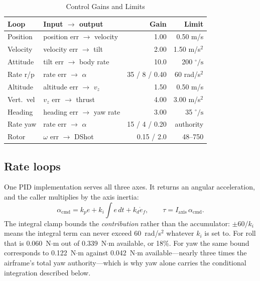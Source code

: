 \documentclass[conference]{IEEEtran}
\newcommand{\dps}{\ensuremath{^{\circ}\!/\mathrm{s}}}
\begin{document}
\begin{table}[!t]
\caption{Control Gains and Limits}
\label{tab:gains}
\centering
\footnotesize
\begin{tabular}{@{}llrr@{}}
\toprule
Loop & Input $\rightarrow$ output & Gain & Limit \\
\midrule
Position   & position err $\rightarrow$ velocity    & 1.00 & 0.50 m/s \\
Velocity   & velocity err $\rightarrow$ tilt        & 2.00 & 1.50 m/s$^2$ \\
Attitude   & tilt err $\rightarrow$ body rate       & 10.0 & 200 \dps \\
Rate r/p   & rate err $\rightarrow$ $\alpha$        & 35 / 8 / 0.40 & 60 rad/s$^2$ \\
Altitude   & altitude err $\rightarrow$ $v_z$       & 1.50 & 0.50 m/s \\
Vert.\ vel & $v_z$ err $\rightarrow$ thrust         & 4.00 & 3.00 m/s$^2$ \\
Heading    & heading err $\rightarrow$ yaw rate     & 3.00 & 35 \dps \\
Rate yaw   & rate err $\rightarrow$ $\alpha$        & 15 / 4 / 0.20 & authority \\
Rotor      & $\omega$ err $\rightarrow$ DShot       & 0.15 / 2.0 & 48--750 \\
\bottomrule
\end{tabular}
\end{table}

\subsection{Rate loops}

One PID implementation serves all three axes. It returns an angular
acceleration, and the caller multiplies by the axis inertia:
\begin{equation}
\alpha_{\text{cmd}} = k_p e + k_i\!\!\int\!\! e\,dt + k_d \dot{e}_f,
\qquad
\tau = I_{\text{axis}}\,\alpha_{\text{cmd}}.
\end{equation}
The integral clamp bounds the \emph{contribution} rather than the accumulator:
$\pm 60/k_i$ means the integral term can never exceed 60~rad/s$^{2}$ whatever
$k_i$ is set to. For roll that is 0.060~N$\cdot$m out of 0.339~N$\cdot$m
available, or 18\%. For yaw the same bound corresponds to 0.122~N$\cdot$m
against 0.042~N$\cdot$m available---nearly three times the airframe's total
yaw authority---which is why yaw alone carries the conditional integration
described below.
\end{document}
